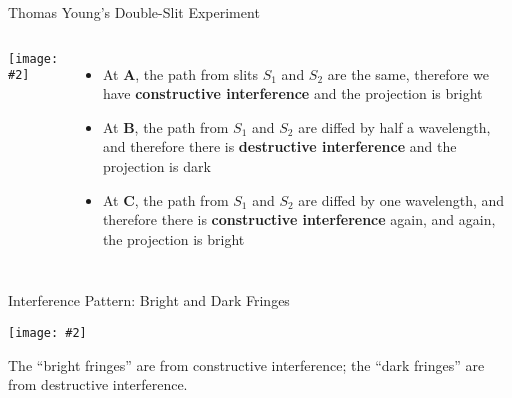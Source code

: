 \documentclass[compress,aspectratio=169]{beamer}
\newcommand{\pic}[2]{\texttt{[image: \#2]}}
\begin{document}
\begin{frame}{Thomas Young's Double-Slit Experiment}
  \begin{columns}
    \pic{1.15}{graphics/path1.png}
    
    \begin{itemize}
    \item At \textbf{A}, the path from slits $S_1$ and $S_2$ are the same,
      therefore we have \textbf{constructive interference} and the projection
      is bright
    \item At \textbf{B}, the path from $S_1$ and $S_2$ are diffed by half a
      wavelength, and therefore there is \textbf{destructive interference} and
      the projection is dark
    \item At \textbf{C}, the path from $S_1$ and $S_2$ are diffed by one
      wavelength, and therefore there is \textbf{constructive interference}
      again, and again, the projection is bright
    \end{itemize}
  \end{columns}
\end{frame}



\begin{frame}{Interference Pattern: Bright and Dark Fringes}
  \begin{center}
    \pic{.4}{graphics/fringes1.png}
  \end{center}
  The ``bright fringes'' are from constructive interference; the ``dark
  fringes'' are from destructive interference.
\end{frame}
\end{document}
